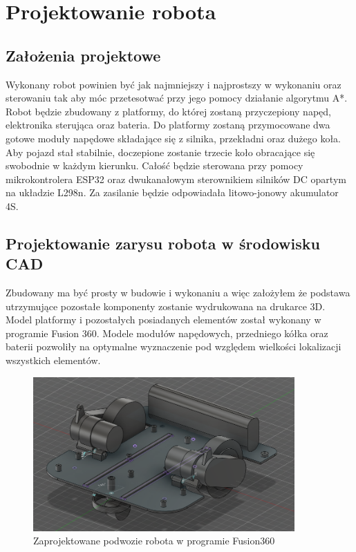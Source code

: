 \section{Projektowanie robota}
\subsection{Założenia projektowe}
Wykonany robot powinien być jak najmniejszy i najprostszy w wykonaniu oraz sterowaniu tak aby móc przetesotwać przy jego pomocy działanie algorytmu A*. 
Robot będzie zbudowany z platformy, do której zostaną przyczepiony napęd, elektronika sterująca oraz bateria. 
Do platformy zostaną przymocowane dwa gotowe moduły napędowe składające się z silnika, przekładni oraz dużego koła. 
Aby pojazd stał stabilnie, doczepione zostanie trzecie koło obracające się swobodnie w każdym kierunku.
Całość będzie sterowana przy pomocy mikrokontrolera ESP32 oraz dwukanałowym sterownikiem silników DC opartym na układzie L298n.
Za zasilanie będzie odpowiadała litowo-jonowy akumulator 4S.

\subsection{Projektowanie zarysu robota w środowisku CAD}
Zbudowany ma być prosty w budowie i wykonaniu a więc założyłem że podstawa utrzymujące pozostałe komponenty
zostanie wydrukowana na drukarce 3D. Model platformy i pozostałych posiadanych elementów został wykonany w programie Fusion 360.
Modele modułów napędowych, przedniego kółka oraz baterii pozwoliły na optymalne wyznaczenie pod względem wielkości lokalizacji wszystkich elementów.

\begin{figure}[H]
	\centering
	\includegraphics[width=10cm]{pages/robot/zdjecia/robotModelCaly.png}
	\caption{Zaprojektowane podwozie robota w programie Fusion360}
	\label{fig:Rys}
\end{figure}


